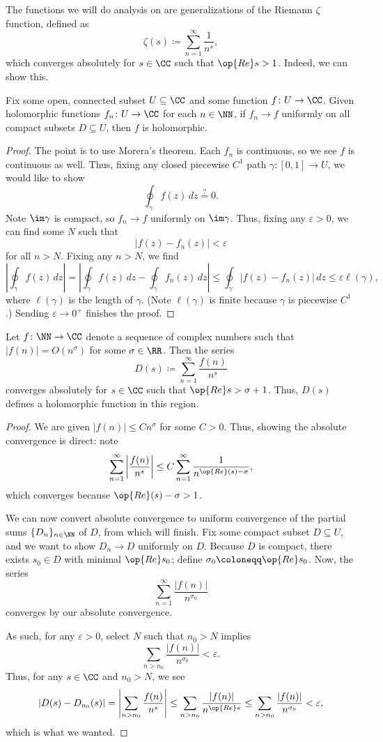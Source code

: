 \documentclass[../notes.tex]{subfiles}
\begin{document}
The functions we will do analysis on are generalizations of the Riemann $\zeta$ function, defined as
\[\zeta(s)\coloneqq\sum_{n=1}^\infty\frac1{n^s},\]
which converges absolutely for $s\in\CC$ such that $\op{Re}s>1$. Indeed, we can show this.
\begin{lemma} \label{lem:holo-limit}
	Fix some open, connected subset $U\subseteq\CC$ and some function $f\colon U\to\CC$. Given holomorphic functions $f_n\colon U\to\CC$ for each $n\in\NN$, if $f_n\to f$ uniformly on all compact subsets $D\subseteq U$, then $f$ is holomorphic.
\end{lemma}
\begin{proof}
	The point is to use Morera's theorem. Each $f_n$ is continuous, so we see $f$ is continuous as well. Thus, fixing any closed piecewise $C^1$ path $\gamma\colon[0,1]\to U$, we would like to show
	\[\oint_\gamma f(z)\,dz\stackrel?=0.\]
	Note $\im\gamma$ is compact, so $f_n\to f$ uniformly on $\im\gamma$. Thus, fixing any $\varepsilon>0$, we can find some $N$ such that
	\[|f(z)-f_n(z)|<\varepsilon\]
	for all $n>N$. Fixing any $n>N$, we find
	\[\left|\oint_\gamma f(z)\,dz\right|=\left|\oint_\gamma f(z)\,dz-\oint_\gamma f_n(z)\,dz\right|\le\oint_\gamma|f(z)-f_n(z)|\,dz\le\varepsilon\ell(\gamma),\]
	where $\ell(\gamma)$ is the length of $\gamma$. (Note $\ell(\gamma)$ is finite because $\gamma$ is piecewise $C^1$.) Sending $\varepsilon\to0^+$ finishes the proof.
\end{proof}
\begin{proposition} \label{prop:basic-dirichlet-series}
	Let $f\colon\NN\to\CC$ denote a sequence of complex numbers such that $|f(n)|=O\left(n^\sigma\right)$ for some $\sigma\in\RR$. Then the series
	\[D(s)\coloneqq\sum_{n=1}^\infty\frac{f(n)}{n^s}\]
	converges absolutely for $s\in\CC$ such that $\op{Re}s>\sigma+1$. Thus, $D(s)$ defines a holomorphic function in this region.
\end{proposition}
\begin{proof}
	We are given $|f(n)|\le Cn^\sigma$ for some $C>0$. Thus, showing the absolute convergence is direct: note
	\[\sum_{n=1}^\infty\left|\frac{f(n)}{n^s}\right|\le C\sum_{n=1}^\infty\frac1{n^{\op{Re}(s)-\sigma}},\]
	which converges because $\op{Re}(s)-\sigma>1$.
	
	We can now convert absolute convergence to uniform convergence of the partial sums $\{D_n\}_{n\in\NN}$ of $D$, from which  will finish. Fix some compact subset $D\subseteq U$, and we want to show $D_n\to D$ uniformly on $D$. Because $D$ is compact, there exists $s_0\in D$ with minimal $\op{Re}s_0$; define $\sigma_0\coloneqq\op{Re}s_0$. Now, the series
	\[\sum_{n=1}^\infty\frac{|f(n)|}{n^{\sigma_0}}\]
	converges by our absolute convergence.
	
	As such, for any $\varepsilon>0$, select $N$ such that $n_0>N$ implies
	\[\sum_{n>n_0}\frac{|f(n)|}{n^{\sigma_0}}<\varepsilon.\]
	Thus, for any $s\in\CC$ and $n_0>N$, we see
	\[\left|D(s)-D_{n_0}(s)\right|=\left|\sum_{n>n_0}\frac{f(n)}{n^s}\right|\le\sum_{n>n_0}\frac{|f(n)|}{n^{\op{Re}s}}\le\sum_{n>n_0}\frac{|f(n)|}{n^{\sigma_0}}<\varepsilon,\]
	which is what we wanted.
\end{proof}
\end{document}
